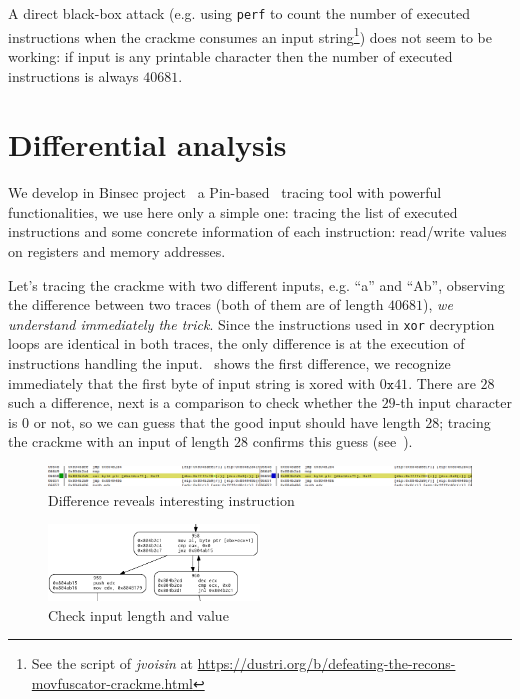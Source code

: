 \documentclass{easychair}
\begin{document}
A direct black-box attack (e.g. using \texttt{perf} to count the number of executed instructions when the crackme consumes an input string\footnote{See the script of \emph{jvoisin} at \url{https://dustri.org/b/defeating-the-recons-movfuscator-crackme.html}}) does not seem to be working: if input is any printable character then the number of executed instructions is always $40681$.

\section{Differential analysis}
We develop in Binsec project~\autocite{binsec} a Pin-based~\autocite{LukCMPKLWRH05} tracing tool with powerful functionalities, we use here only a simple one: tracing the list of executed instructions and some concrete information of each instruction: read/write values on registers and memory addresses.

Let's tracing the crackme with two different inputs, e.g. ``a'' and ``Ab'', observing the difference between two traces (both of them are of length $40681$),  \emph{we understand immediately the trick}. Since the instructions used in \texttt{xor} decryption loops are identical in both traces, the only difference is at the execution of instructions handling the input.~ shows the first difference, we recognize immediately that the first byte of input string is xored with $0\mathtt{x}41$. There are $28$ such a difference, next is a comparison to check whether the $29$-th input character is $0$ or not, so we can guess that the good input should have length $28$; tracing the crackme with an input of length $28$ confirms this guess (see~). 

\begin{figure}[ht]
  \centering
  \includegraphics[width=1.0\textwidth,keepaspectratio]{compare_first.png}
  \caption{Difference reveals interesting instruction}
  \label{fig:firstdiff}
\end{figure}

\begin{figure}[ht]
  \centering
  \includegraphics[width=0.5\textwidth,keepaspectratio]{check_input.png}
  \caption{Check input length and value}
  \label{fig:checkinput}
\end{figure}
\end{document}
